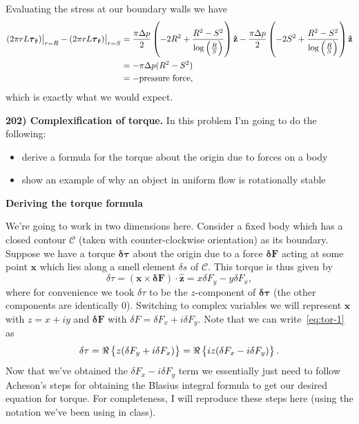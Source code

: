 \documentclass{article}
\def\*#1{\mathbf{#1}}
\newcommand{\fC}{\mathcal{C}} %
\newcommand{\rhat}{\mathbf{\hat{r}}}
\newcommand{\zhat}{\mathbf{\hat{z}}}
\newcommand{\tauvec}{\boldsymbol{\tau}}
\newcommand{\dtauvec}{\boldsymbol{\delta \tau}}
\newcommand{\dFvec}{\boldsymbol{\delta} \mathbf{F}}
\newcommand{\dF}{\delta F}
\newcommand{\ds}{\delta s}
\newcommand{\dtau}{\delta \tau}
\begin{document}
%
Evaluating the stress at our boundary walls we have
%
\begin{align*}
    \eval[1]{\del{2 \pi r L \tauvec_\rhat}}_{r = R} - \eval[1]{\del{2 \pi r L \tauvec_\rhat}}_{r = S}
        &= \frac{\pi \Delta p}{2} \del{- 2 R^2 + \frac{R^2 - S^2}{\log\del{\frac{R}{S}}}} \zhat
           - \frac{\pi \Delta p}{2} \del{- 2 S^2 + \frac{R^2 - S^2}{\log\del{\frac{R}{S}}}} \zhat \\
        &= - \pi \Delta p (R^2 - S^2) \\
        &= - \text{pressure force}
        ,
\end{align*}
%
which is exactly what we would expect.

\newpage

\textbf{202) Complexification of torque.}
In this problem I'm going to do the following:
%
\begin{itemize}
    \item derive a formula for the torque about the origin due to forces on a body
    \item show an example of why an object in uniform flow is rotationally stable
\end{itemize}

\textbf{Deriving the torque formula}

We're going to work in two dimensions here. Consider a fixed body which
has a closed contour $\fC$ (taken with counter-clockwise orientation) as
its boundary. Suppose we have a torque $\dtauvec$ about the origin due
to a force $\dFvec$ acting at some point $\*x$ which lies along a smell
element $\ds$ of $\fC$. This torque is thus given by
%
\begin{equation}
    \dtau = (\*x \times \dFvec) \cdot \zhat = x \dF_y - y \dF_x
    \label{eq:tor-1}
    ,
\end{equation}
%
where for convenience we took $\dtau$ to be the $z$-component of
$\dtauvec$ (the other components are identically 0). Switching to complex
variables we will represent $\*x$ with $z = x + i y$ and $\dFvec$ with $\dF =
\dF_x + i \dF_y$. Note that we can write~\eqref{eq:tor-1} as
%
\begin{equation}
    \dtau = \Re \cbr{z (\dF_y + i \dF_x)} = \Re \cbr{i z (\dF_x - i \dF_y)}
    \label{eq:tor-2}
    .
\end{equation}
%
Now that we've obtained the $\dF_x - i \dF_y$ term we essentially just
need to follow Acheson's steps for obtaining the Blasius integral
formula to get our desired equation for torque. For completeness, I will
reproduce these steps here (using the notation we've been using in class).
\end{document}
